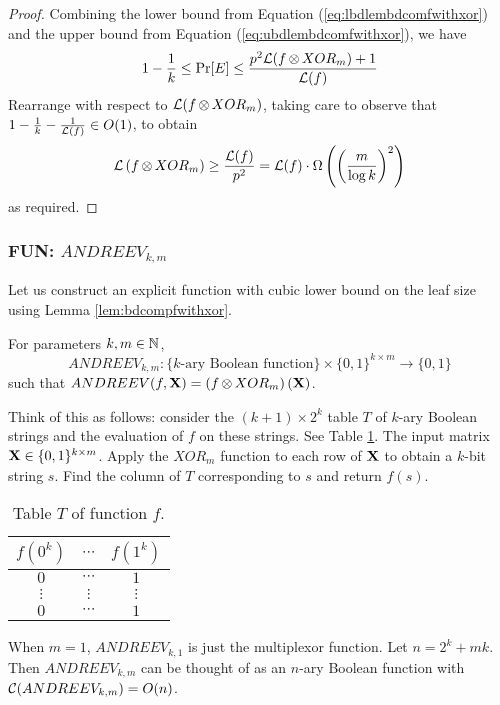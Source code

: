 \documentclass[11pt]{article}
\begin{document}
\begin{proof}
		Combining the lower bound from Equation (\ref{eq:lbdlembdcomfwithxor}) and the upper bound from Equation (\ref{eq:ubdlembdcomfwithxor}), we have
		\[1 - \frac{1}{k} \leq \Pr[E] \leq \frac{p^2\mathcal{L}(f \operatorname*{\otimes} XOR_m) + 1}{\mathcal{L}(f)}\]
		Rearrange with respect to $\mathcal{L}(f \operatorname*{\otimes} XOR_m)$, taking care to observe that $1 - \frac{1}{k} - \frac{1}{\mathcal{L}(f)} \in O(1)$, to obtain
		\[\mathcal{L}\left(f \operatorname*{\otimes} XOR_m\right) \geq \frac{\mathcal{L}(f)}{p^2} = \mathcal{L}(f) \cdot \Omega\left(\left(\frac{m}{\log k}\right)^2\right)\]
		as required. 
	\end{proof}
	
	\subsubsection{FUN: \texorpdfstring{$ANDREEV_{k,m}$}{ANDREEVkm}}
	Let us construct an explicit function with cubic lower bound on the leaf size using Lemma \ref{lem:bdcompfwithxor}.
	\begin{definition}
		For parameters $k, m \in \mathbb{N}$,
		\[ANDREEV_{k,m}: \{\mbox{$k$-ary Boolean function}\} \times \{0,1\}^{k\times m} \rightarrow \{0,1\}\] 
		such that $ANDREEV(f, \mathbf{X}) = \left(f\operatorname*{\otimes} XOR_m\right)(\mathbf{X})$.
		
		Think of this as follows: consider the $(k + 1) \times 2^{k}$ table $T$ of $k$-ary Boolean strings and the evaluation of $f$ on these strings. See Table \ref{table:andreev}. The input matrix $\mathbf{X} \in \{0,1\}^{k \times m}$. Apply the $XOR_m$ function to each row of $\mathbf{X}$ to obtain a $k$-bit string $s$. Find the column of $T$ corresponding to $s$ and return $f(s)$.
		\begin{table}[!ht]
			\centering
			\begin{tabular}{|c|c|c|}
				\hline
				$f(0^k)$ & $\cdots$ & $f(1^k)$\\
				\hline
				$0$ & $\cdots$ & $1$\\
				$\vdots$ & $\vdots$ & $\vdots$\\
				$0$ & $\cdots$ & $1$\\
				\hline
			\end{tabular}
			\caption{Table $T$ of function $f$.}
			\label{table:andreev}
		\end{table}	
	\end{definition}
	When $m = 1$, $ANDREEV_{k,1}$ is just the multiplexor function. Let $n = 2^k + mk$. Then $ANDREEV_{k,m}$ can be thought of as an $n$-ary Boolean function with $\mathcal{C}(ANDREEV_{k, m}) = O(n)$. 
	
\end{document}
